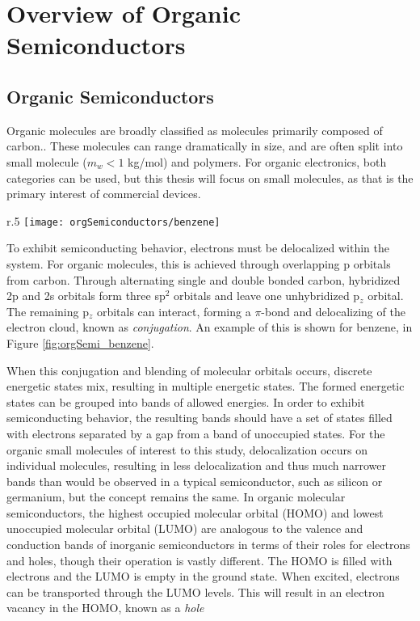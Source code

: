 \documentclass[../thesis.tex]{subfiles}
\begin{document}
\chapter{Overview of Organic Semiconductors}\label{sec:orgSemi}

\section{Organic Semiconductors}

Organic molecules are broadly classified as molecules primarily composed of carbon.\supercite{Pope1999}.
These molecules can range dramatically in size, and are often split into small molecule ($m_w<1$ kg/mol) and polymers.
For organic electronics, both categories can be used, but this thesis will focus on small molecules, as that is the primary interest of commercial devices.

\begin{wrapfigure}{r}{.5\textwidth}
\centering
\texttt{[image: orgSemiconductors/benzene]}
\caption{Molecular orbitals of benzene.  The left figure shows the 6 out of plain p$_z$ orbitals, and the right image shows the delocalized $\pi$-bond.\supercite{benzene}}
\label{fig:orgSemi_benzene}
\end{wrapfigure}

To exhibit semiconducting behavior, electrons must be delocalized within the system.\supercite{Neamen1992}
For organic molecules, this is achieved through overlapping p orbitals from carbon.  
Through alternating single and double bonded carbon, hybridized 2p and 2s orbitals form three sp$^2$ orbitals and leave one unhybridized p$_z$ orbital.
The remaining p$_z$ orbitals can interact, forming a $\pi$-bond and delocalizing of the electron cloud, known as \textit{conjugation}.
An example of this is shown for benzene, in Figure \ref{fig:orgSemi_benzene}.

When this conjugation and blending of molecular orbitals occurs, discrete energetic states mix, resulting in multiple energetic states.\supercite{Kittel2005,Wallis2000}
The formed energetic states can be grouped into bands of allowed energies.
In order to exhibit semiconducting behavior, the resulting bands should have a set of states filled with electrons separated by a gap from a band of unoccupied states.
For the organic small molecules of interest to this study, delocalization occurs on individual molecules, resulting in less delocalization and thus much narrower bands than would be observed in a typical semiconductor, such as silicon or germanium, but the concept remains the same.
In organic molecular semiconductors, the highest occupied molecular orbital (HOMO) and lowest unoccupied molecular orbital (LUMO) are analogous to the valence and conduction bands of inorganic semiconductors in terms of their roles for electrons and holes, though their operation is vastly different.
The HOMO is filled with electrons and the LUMO is empty in the ground state.
When excited, electrons can be transported through the LUMO levels.
This will result in an electron vacancy in the HOMO, known as a \textit{hole}
\end{document}

